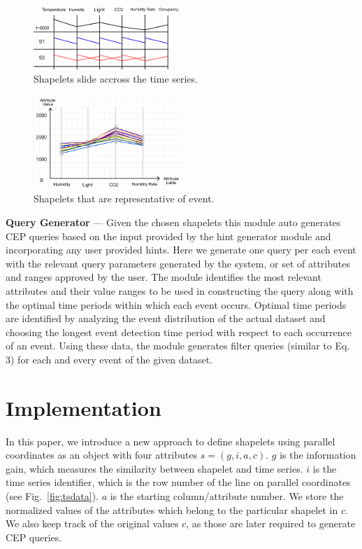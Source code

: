 \documentclass[conference]{IEEEtran}  %
\begin{document}
\begin{figure}
\includegraphics[width=0.5\textwidth]{movingWindow.png}
\caption{Shapelets slide accross the time series.}
\label{fig:tsshapes}
\end{figure}

\begin{figure}
\includegraphics[width=0.5\textwidth]{demo.png}
\caption{Shapelets that are representative of event.}
\label{fig:tswin}
\end{figure}

\textbf{Query Generator} --- Given the chosen shapelets this module auto generates CEP queries based on the input provided by the hint generator module and incorporating any user provided hints. Here we generate one query per each event with the relevant query parameters generated by the system, or set of attributes and ranges approved by the user. The module identifies the most relevant attributes and their value ranges to be used in constructing the query along with the optimal time periods within which each event occurs. Optimal time periods are identified by analyzing the event distribution of the actual dataset and choosing the longest event detection time period with respect to each occurrence of an event. Using these data, the module generates filter queries (similar to Eq. 3) for each and every event of the given dataset.

\section{Implementation}
In this paper, we introduce a new approach to define shapelets using parallel coordinates as an object with four attributes ${s = (g,i,a,c)}$. $g$ is the information gain, which measures the similarity between shapelet and time series. $i$ is the time series identifier, which is the row number of the line on parallel coordinates (see Fig.~\ref{fig:tsdata}). $a$ is the starting column/attribute number. We store the normalized values of the attributes which belong to the particular shapelet in $c$. We also keep track of the original values $c$, as those are later required to generate CEP queries.
\end{document}
